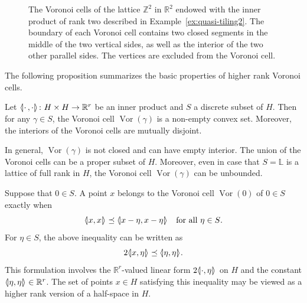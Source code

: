 \documentclass[AHL,Unicode,longabstracts]{cedram}
\newcommand{\llangle}{\mathopen{\langle\mkern -3.1mu\lvert}}
\newcommand{\rrangle}{\mathclose{\rvert\mkern -3.1mu\rangle}}
\newcommand{\highinn}[2]{{\llangle#2\rrangle_{#1}}}
\DeclareMathOperator{\Vor}{Vor}
\newcommand{\R}{\mathbb{R}}
\newcommand{\Z}{\mathbb{Z}}
\renewcommand{\L}{\mathbb{L}}
\renewcommand*{\to}{\mathchoice{\longrightarrow}{\rightarrow}{\rightarrow}{\rightarrow}}
\begin{document}
\begin{figure}[!t]

\caption{The Voronoi cells of the lattice $\Z^2$ in $\R^2$ endowed with the inner product of rank two described in Example~\ref{ex:quasi-tiling2}. The boundary of each Voronoi cell contains two closed segments in the middle of the two vertical sides, as well as the interior of the two other parallel sides. The vertices are excluded from the Voronoi cell.}\label{fig:quasi-tiling2}
\end{figure}


The following proposition summarizes the basic properties of higher rank Voronoi cells.

\begin{prop}\label{prop:general_voronoi}
Let $\highinn{}{\cdot\,,\cdot}\colon H\times H \to \R^r$ be an inner product and $S$ a discrete subset of $H$. Then for any $\gamma\in S$, the Voronoi cell $\Vor(\gamma)$ is a non-empty convex set. Moreover, the interiors of the Voronoi cells are mutually disjoint.

In general, $\Vor(\gamma)$ is not closed and can have empty interior. The union of the Voronoi cells can be a proper subset of $H$. Moreover, even in case that $S = \L$ is a lattice of full rank in $H$, the Voronoi cell $\Vor(\gamma)$ can be unbounded.
\end{prop}



Suppose that $0 \in S$. A point $x$ belongs to the Voronoi cell $\Vor(0)$ of $0 \in S$ exactly when
\[
\highinn{}{x,x} \preceq \highinn{}{x - \eta, x-\eta} \quad \text{for all $\eta \in S$}.
\]
For $\eta \in S$, the above inequality can be written as
\[
2 \highinn{}{x,\eta} \preceq \highinn{}{\eta,\eta}.
\]
This formulation involves the $\R^r$-valued linear form $2 \highinn{}{\cdot,\eta}$ on $H$ and the constant $\highinn{}{\eta,\eta} \in \R^r$. The set of points $x \in H$ satisfying this inequality may be viewed as a higher rank version of a half-space in $H$.
\end{document}

